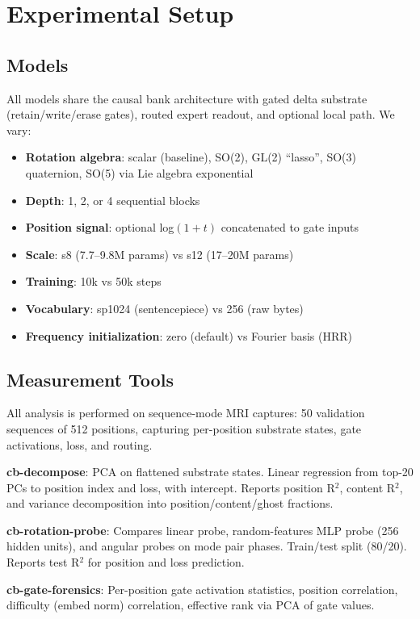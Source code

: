 \documentclass[11pt,a4paper]{article}
\begin{document}
\section{Experimental Setup}

\subsection{Models}

All models share the causal bank architecture with gated delta substrate (retain/write/erase gates), routed expert readout, and optional local path. We vary:
\begin{itemize}
\item \textbf{Rotation algebra}: scalar (baseline), SO(2), GL(2) ``lasso'', SO(3) quaternion, SO(5) via Lie algebra exponential
\item \textbf{Depth}: 1, 2, or 4 sequential blocks
\item \textbf{Position signal}: optional log$(1+t)$ concatenated to gate inputs
\item \textbf{Scale}: s8 (7.7--9.8M params) vs s12 (17--20M params)
\item \textbf{Training}: 10k vs 50k steps
\item \textbf{Vocabulary}: sp1024 (sentencepiece) vs 256 (raw bytes)
\item \textbf{Frequency initialization}: zero (default) vs Fourier basis (HRR)
\end{itemize}

\subsection{Measurement Tools}

All analysis is performed on sequence-mode MRI captures: 50 validation sequences of 512 positions, capturing per-position substrate states, gate activations, loss, and routing.

\textbf{cb-decompose}: PCA on flattened substrate states. Linear regression from top-20 PCs to position index and loss, with intercept. Reports position R$^2$, content R$^2$, and variance decomposition into position/content/ghost fractions.

\textbf{cb-rotation-probe}: Compares linear probe, random-features MLP probe (256 hidden units), and angular probes on mode pair phases. Train/test split (80/20). Reports test R$^2$ for position and loss prediction.

\textbf{cb-gate-forensics}: Per-position gate activation statistics, position correlation, difficulty (embed norm) correlation, effective rank via PCA of gate values.
\end{document}
